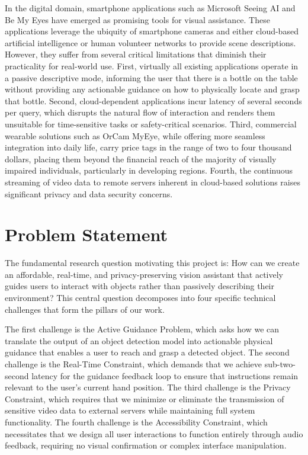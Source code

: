 \documentclass[12pt,a4paper]{report}
\begin{document}
In the digital domain, smartphone applications such as Microsoft Seeing AI and Be My Eyes have emerged as promising tools for visual assistance. These applications leverage the ubiquity of smartphone cameras and either cloud-based artificial intelligence or human volunteer networks to provide scene descriptions. However, they suffer from several critical limitations that diminish their practicality for real-world use. First, virtually all existing applications operate in a passive descriptive mode, informing the user that there is a bottle on the table without providing any actionable guidance on how to physically locate and grasp that bottle. Second, cloud-dependent applications incur latency of several seconds per query, which disrupts the natural flow of interaction and renders them unsuitable for time-sensitive tasks or safety-critical scenarios. Third, commercial wearable solutions such as OrCam MyEye, while offering more seamless integration into daily life, carry price tags in the range of two to four thousand dollars, placing them beyond the financial reach of the majority of visually impaired individuals, particularly in developing regions. Fourth, the continuous streaming of video data to remote servers inherent in cloud-based solutions raises significant privacy and data security concerns.

\section{Problem Statement}

The fundamental research question motivating this project is: How can we create an affordable, real-time, and privacy-preserving vision assistant that actively guides users to interact with objects rather than passively describing their environment? This central question decomposes into four specific technical challenges that form the pillars of our work.

The first challenge is the Active Guidance Problem, which asks how we can translate the output of an object detection model into actionable physical guidance that enables a user to reach and grasp a detected object. The second challenge is the Real-Time Constraint, which demands that we achieve sub-two-second latency for the guidance feedback loop to ensure that instructions remain relevant to the user's current hand position. The third challenge is the Privacy Constraint, which requires that we minimize or eliminate the transmission of sensitive video data to external servers while maintaining full system functionality. The fourth challenge is the Accessibility Constraint, which necessitates that we design all user interactions to function entirely through audio feedback, requiring no visual confirmation or complex interface manipulation.
\end{document}
